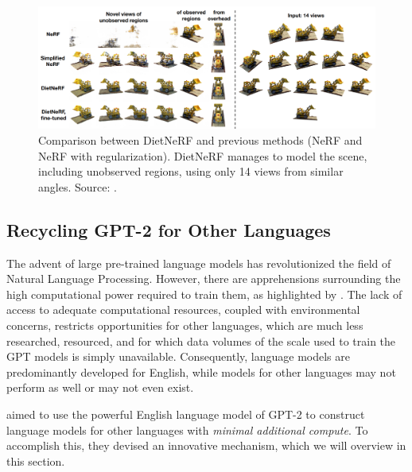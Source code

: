 \documentclass{article}
\begin{document}
\begin{figure}[ht!]
    \begin{center}
        \includegraphics[width=1.0\textwidth]{figures/dietnerf_performance.png}
    \end{center}
    \caption{
        Comparison between DietNeRF and previous methods (NeRF and NeRF with regularization). DietNeRF manages to model the scene, including unobserved regions, using only 14 views from similar angles. Source: \citet{Jain_2021_dietnerf}.
    } 
    \label{fig:dietnerf_performance}
\end{figure}


\subsection{Recycling GPT-2 for Other Languages}
\label{sec:recycling-gpt}

The advent of large pre-trained language models has revolutionized the field of Natural Language Processing. However, there are apprehensions surrounding the high computational power required to train them, as highlighted by \citet{strubell2019energy}. The lack of access to adequate computational resources, coupled with environmental concerns, restricts opportunities for other languages, which are much less researched, resourced, and for which data volumes of the scale used to train the GPT models is simply unavailable. Consequently, language models are predominantly developed for English, while models for other languages may not perform as well or may not even exist.

\medskip
\noindent
\citet{deVries2020recycle} aimed to use the powerful English language model of GPT-2 to construct language models for other languages with \emph{minimal additional compute}. To accomplish this, they devised an innovative mechanism, which we will overview in this section.
\end{document}
